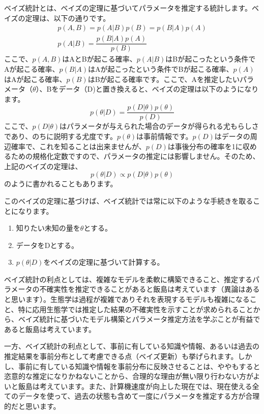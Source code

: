 ベイズ統計とは、ベイズの定理に基づいてパラメータを推定する統計します。ベイズの定理は、以下の通りです。
\begin{align}
p(A, B) = p(A|B)p(B) = p(B|A)p(A) \\
p(A|B) = \dfrac{p(B|A)p(A)}{p(B)}
\end{align}
ここで、$p(A, B)$はAとBが起こる確率、$p(A|B)$はBが起こったという条件でAが起こる確率、$p(B|A)$はAが起こったという条件でBが起こる確率、$p(A)$はAが起こる確率、$p(B)$はBが起こる確率です。ここで、Aを推定したいパラメータ（$\theta$）、Bをデータ（D)と置き換えると、ベイズの定理は以下のようになります。
\begin{equation}
p(\theta|D) = \dfrac{p(D|\theta)p(\theta)}{p(D)}
\end{equation}
ここで、$p(D|\theta)$はパラメータが与えられた場合のデータが得られる尤もらしさであり、のちに説明する尤度です。$p(\theta)$は事前情報です。$p(D)$はデータの周辺確率で、これを知ることは出来ませんが、$p(D)$は事後分布の確率を1に収めるための規格化定数ですので、パラメータの推定には影響しません。そのため、上記のベイズの定理は、
\begin{equation}
p(\theta|D) \propto p(D|\theta)p(\theta)
\end{equation}
のように書かれることもあります。

このベイズの定理に基づけば、ベイズ統計では常に以下のような手続きを取ることになります。
\begin{enumerate}
\item 知りたい未知の量を$\theta$とする。
\item データをDとする。
\item $p(\theta|D)$をベイズの定理に基づいて計算する。
\end{enumerate}

ベイズ統計の利点としては、複雑なモデルを柔軟に構築できること、推定するパラメータの不確実性を推定できることがあると飯島は考えています（異論はあると思います）。生態学は過程が複雑でありそれを表現するモデルも複雑になること、特に応用生態学では推定した結果の不確実性を示すことが求められることから、ベイズ統計に基づいたモデル構築とパラメータ推定方法を学ぶことが有益であると飯島は考えています。

一方、ベイズ統計の利点として、事前に有している知識や情報、あるいは過去の推定結果を事前分布として考慮できる点（ベイズ更新）も挙げられます。しかし、事前に有している知識や情報を事前分布に反映させることは、ややもすると恣意的な推定になりかねないことから、合理的な理由が無い限り行わない方がよいと飯島は考えています。また、計算機速度が向上した現在では、現在使える全てのデータを使って、過去の状態も含めて一度にパラメータを推定する方が合理的だと思います。

